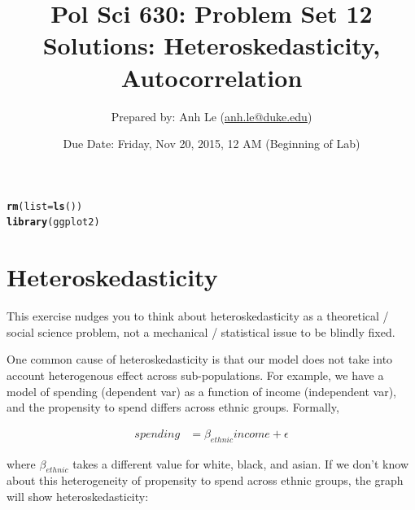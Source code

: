 \documentclass{article}\usepackage[]{graphicx}\usepackage[]{color}
\makeatletter
\newcommand{\hlstd}[1]{\textcolor[rgb]{0.345,0.345,0.345}{#1}}%
\newcommand{\hlkwc}[1]{\textcolor[rgb]{0.333,0.667,0.333}{#1}}%
\newcommand{\hlkwd}[1]{\textcolor[rgb]{0.737,0.353,0.396}{\textbf{#1}}}%
\newenvironment{kframe}{%
 \def\at@end@of@kframe{}%
 \ifinner\ifhmode%
  \def\at@end@of@kframe{\end{minipage}}%
  \begin{minipage}{\columnwidth}%
 \fi\fi%
 \def\FrameCommand##1{\hskip\@totalleftmargin \hskip-\fboxsep
 \colorbox{shadecolor}{##1}\hskip-\fboxsep
     \hskip-\linewidth \hskip-\@totalleftmargin \hskip\columnwidth}%
 \MakeFramed {\advance\hsize-\width
   \@totalleftmargin\z@ \linewidth\hsize
   \@setminipage}}%
 {\par\unskip\endMakeFramed%
 \at@end@of@kframe}
\newenvironment{knitrout}{}{} %
\makeatother
\begin{document}
\title{Pol Sci 630:  Problem Set 12 Solutions: Heteroskedasticity, Autocorrelation}

\author{Prepared by: Anh Le (\href{mailto:anh.le@duke.edu}{anh.le@duke.edu})}

\date{Due Date: Friday, Nov 20, 2015, 12 AM (Beginning of Lab)}

\maketitle

\begin{knitrout}
\color{fgcolor}\begin{kframe}
\begin{alltt}
\hlkwd{rm}\hlstd{(}\hlkwc{list} \hlstd{=} \hlkwd{ls}\hlstd{())}
\hlkwd{library}\hlstd{(ggplot2)}
\end{alltt}
\end{kframe}
\end{knitrout}


\section{Heteroskedasticity}

This exercise nudges you to think about heteroskedasticity as a theoretical / social science problem, not a mechanical / statistical issue to be blindly fixed.

One common cause of heteroskedasticity is that our model does not take into account heterogenous effect across sub-populations. For example, we have a model of spending (dependent var) as a function of income (independent var), and the propensity to spend differs across ethnic groups. Formally,

\begin{align}
spending &= \beta_{ethnic} income + \epsilon
\end{align}

where $\beta_{ethnic}$ takes a different value for white, black, and asian. If we don't know about this heterogeneity of propensity to spend across ethnic groups, the graph will show heteroskedasticity:
\end{document}
